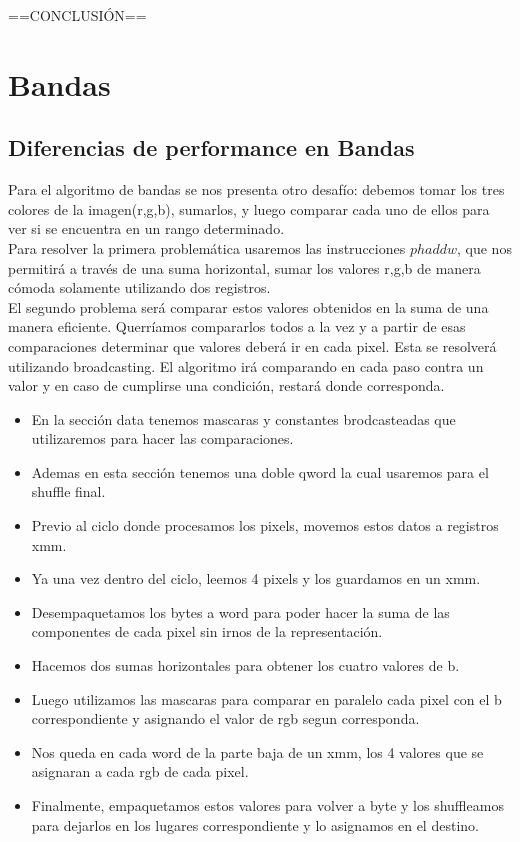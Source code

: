 \documentclass[a4paper]{article}
\begin{document}
==CONCLUSIÓN==

\newpage
\section{Bandas}
\subsection{Diferencias de performance en Bandas}
Para el algoritmo de bandas se nos presenta otro desafío: debemos tomar los tres colores de la imagen(r,g,b), sumarlos, y luego comparar cada uno de ellos para ver si se encuentra en un rango determinado.
\\
Para resolver la primera problemática usaremos las instrucciones $phaddw$, que nos permitirá a través de una suma horizontal, sumar los valores r,g,b de manera cómoda solamente utilizando dos registros.
\\
El segundo problema será comparar estos valores obtenidos en la suma de una manera eficiente. Querríamos compararlos todos a la vez y a partir de esas comparaciones determinar que valores deberá ir en cada pixel. Esta se resolverá utilizando broadcasting. El algoritmo irá comparando en cada paso contra un valor y en caso de cumplirse una condición, restará donde corresponda.


\begin{itemize}
\item  En la sección data tenemos mascaras y constantes brodcasteadas que utilizaremos para hacer las comparaciones.
\item  Ademas en esta sección tenemos una doble qword la cual usaremos para el shuffle final.
\item  Previo al ciclo donde procesamos los pixels, movemos estos datos a registros xmm.
\item  Ya una vez dentro del ciclo, leemos 4 pixels y los guardamos en un xmm.
\item  Desempaquetamos los bytes a word para poder hacer la suma de las componentes de cada pixel sin irnos de la representación.
\item  Hacemos dos sumas horizontales para obtener los cuatro valores  de b.
\item  Luego utilizamos las mascaras para comparar en paralelo cada pixel con el b correspondiente y asignando el valor de rgb segun corresponda.
\item  Nos queda en cada word de la parte baja de un xmm, los 4 valores que se asignaran a cada rgb de cada pixel.
\item  Finalmente, empaquetamos estos valores para volver a byte y los shuffleamos para dejarlos en los lugares correspondiente y lo asignamos en el destino.
\end{itemize}
\end{document}
